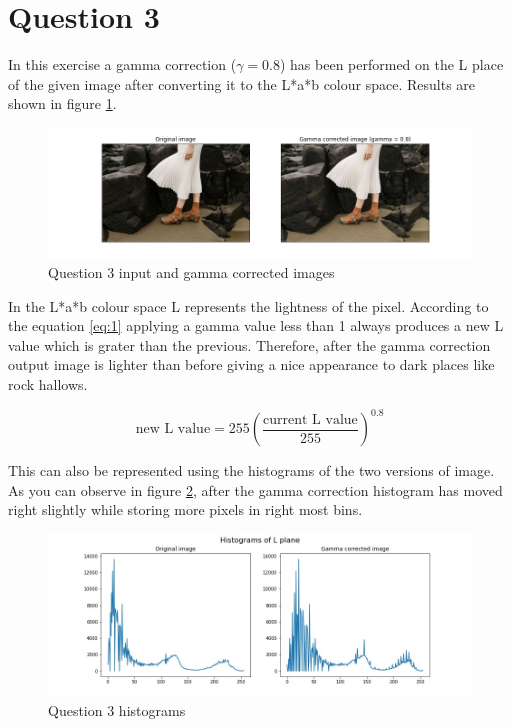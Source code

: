 \documentclass[11pt]{article}
\begin{document}
\section*{Question 3}

In this exercise a gamma correction ($\gamma = 0.8$) has been performed on the L place of the given image after converting it to the L*a*b 
colour space. Results are shown in figure \ref{Question 3 input and output images}.

\begin{figure}[!h]
    \centering
    \includegraphics[width=\textwidth]{Images/31.jpg}
    \caption{Question 3 input and gamma corrected images}
    \label{Question 3 input and output images}
\end{figure}

\noindent In the L*a*b colour space L represents the lightness of the pixel. According to the equation \ref{eq:1} applying a gamma value less than
1 always produces a new L value which is grater than the previous. Therefore, after the gamma correction output image is lighter than before
giving a nice appearance to dark places like rock hallows. 

\begin{equation}\label{eq:1}
    \text{new L value} = 255\left(\frac{\text{current L value}}{255}\right)^{0.8}
\end{equation}

\noindent This can also be represented using the histograms of the two versions of image. As you can observe in figure \ref{Question 3 histograms},
after the gamma correction histogram has moved right slightly while storing more pixels in right most bins.

\begin{figure}[!h]
    \centering
    \includegraphics[width=\textwidth]{Images/32.jpg}
    \caption{Question 3 histograms}
    \label{Question 3 histograms}
\end{figure}
\end{document}
